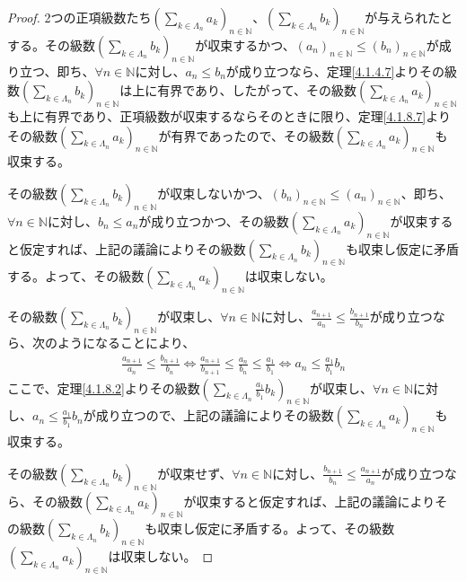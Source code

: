\documentclass[dvipdfmx]{jsarticle}
\begin{document}
\begin{proof}
2つの正項級数たち$\left( \sum_{k \in \varLambda_{n}} a_{k} \right)_{n \in \mathbb{N}}$、$\left( \sum_{k \in \varLambda_{n}} b_{k} \right)_{n \in \mathbb{N}}$が与えられたとする。その級数$\left( \sum_{k \in \varLambda_{n}} b_{k} \right)_{n \in \mathbb{N}}$が収束するかつ、$\left( a_{n} \right)_{n \in \mathbb{N}} \leq \left( b_{n} \right)_{n \in \mathbb{N}}$が成り立つ、即ち、$\forall n \in \mathbb{N}$に対し、$a_{n} \leq b_{n}$が成り立つなら、定理\ref{4.1.4.7}よりその級数$\left( \sum_{k \in \varLambda_{n}} b_{k} \right)_{n \in \mathbb{N}}$は上に有界であり、したがって、その級数$\left( \sum_{k \in \varLambda_{n}} a_{k} \right)_{n \in \mathbb{N}}$も上に有界であり、正項級数が収束するならそのときに限り、定理\ref{4.1.8.7}よりその級数$\left( \sum_{k \in \varLambda_{n}} a_{k} \right)_{n \in \mathbb{N}}$が有界であったので、その級数$\left( \sum_{k \in \varLambda_{n}} a_{k} \right)_{n \in \mathbb{N}}$も収束する。\par
その級数$\left( \sum_{k \in \varLambda_{n}} b_{k} \right)_{n \in \mathbb{N}}$が収束しないかつ、$\left( b_{n} \right)_{n \in \mathbb{N}} \leq \left( a_{n} \right)_{n \in \mathbb{N}}$、即ち、$\forall n \in \mathbb{N}$に対し、$b_{n} \leq a_{n}$が成り立つかつ、その級数$\left( \sum_{k \in \varLambda_{n}} a_{k} \right)_{n \in \mathbb{N}}$が収束すると仮定すれば、上記の議論によりその級数$\left( \sum_{k \in \varLambda_{n}} b_{k} \right)_{n \in \mathbb{N}}$も収束し仮定に矛盾する。よって、その級数$\left( \sum_{k \in \varLambda_{n}} a_{k} \right)_{n \in \mathbb{N}}$は収束しない。\par
その級数$\left( \sum_{k \in \varLambda_{n}} b_{k} \right)_{n \in \mathbb{N}}$が収束し、$\forall n \in \mathbb{N}$に対し、$\frac{a_{n + 1}}{a_{n}} \leq \frac{b_{n + 1}}{b_{n}}$が成り立つなら、次のようになることにより、
\begin{align*}
\frac{a_{n + 1}}{a_{n}} \leq \frac{b_{n + 1}}{b_{n}} \Leftrightarrow \frac{a_{n + 1}}{b_{n + 1}} \leq \frac{a_{n}}{b_{n}} \leq \frac{a_{1}}{b_{1}} \Leftrightarrow a_{n} \leq \frac{a_{1}}{b_{1}}b_{n}
\end{align*}
ここで、定理\ref{4.1.8.2}よりその級数$\left( \sum_{k \in \varLambda_{n}} {\frac{a_{1}}{b_{1}}b_{k}} \right)_{n \in \mathbb{N}}$が収束し、$\forall n \in \mathbb{N}$に対し、$a_{n} \leq \frac{a_{1}}{b_{1}}b_{n}$が成り立つので、上記の議論によりその級数$\left( \sum_{k \in \varLambda_{n}} a_{k} \right)_{n \in \mathbb{N}}$も収束する。\par
その級数$\left( \sum_{k \in \varLambda_{n}} b_{k} \right)_{n \in \mathbb{N}}$が収束せず、$\forall n \in \mathbb{N}$に対し、$\frac{b_{n + 1}}{b_{n}} \leq \frac{a_{n + 1}}{a_{n}}$が成り立つなら、その級数$\left( \sum_{k \in \varLambda_{n}} a_{k} \right)_{n \in \mathbb{N}}$が収束すると仮定すれば、上記の議論によりその級数$\left( \sum_{k \in \varLambda_{n}} b_{k} \right)_{n \in \mathbb{N}}$も収束し仮定に矛盾する。よって、その級数$\left( \sum_{k \in \varLambda_{n}} a_{k} \right)_{n \in \mathbb{N}}$は収束しない。
\end{proof}
\end{document}
